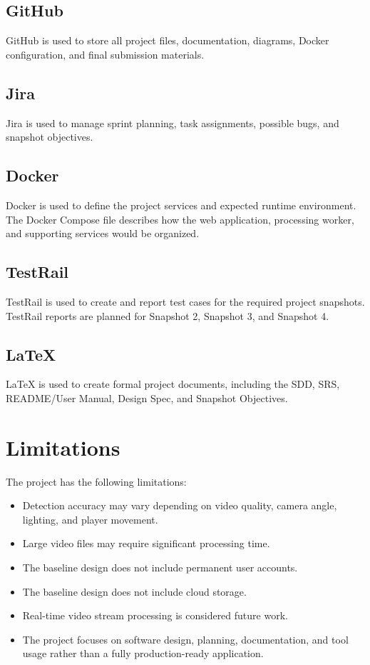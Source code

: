 \documentclass[12pt]{article}
\begin{document}
\subsection{GitHub}
GitHub is used to store all project files, documentation, diagrams, Docker configuration, and final submission materials.

\subsection{Jira}
Jira is used to manage sprint planning, task assignments, possible bugs, and snapshot objectives.

\subsection{Docker}
Docker is used to define the project services and expected runtime environment. The Docker Compose file describes how the web application, processing worker, and supporting services would be organized.

\subsection{TestRail}
TestRail is used to create and report test cases for the required project snapshots. TestRail reports are planned for Snapshot 2, Snapshot 3, and Snapshot 4.

\subsection{LaTeX}
LaTeX is used to create formal project documents, including the SDD, SRS, README/User Manual, Design Spec, and Snapshot Objectives.

\section{Limitations}

The project has the following limitations:

\begin{itemize}[noitemsep]
    \item Detection accuracy may vary depending on video quality, camera angle, lighting, and player movement.
    \item Large video files may require significant processing time.
    \item The baseline design does not include permanent user accounts.
    \item The baseline design does not include cloud storage.
    \item Real-time video stream processing is considered future work.
    \item The project focuses on software design, planning, documentation, and tool usage rather than a fully production-ready application.
\end{itemize}
\end{document}
